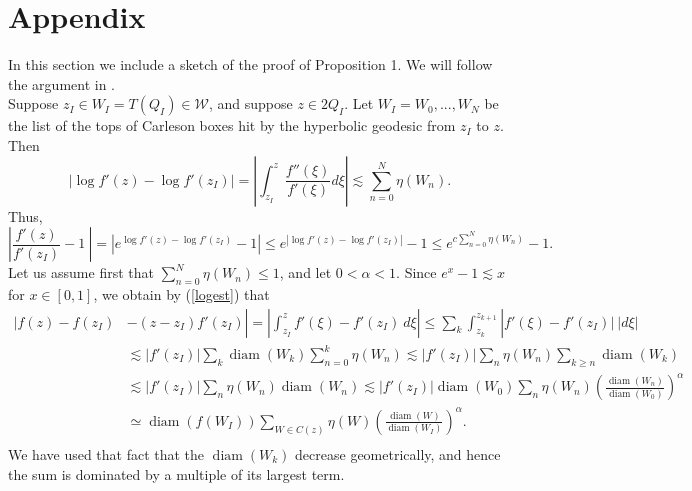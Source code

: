 \documentclass[12pt,a4paper]{article}
\theoremstyle{definition}
\theoremstyle{remark}
\newcommand{\diam}{\operatorname{diam}}
\numberwithin{komcounter}{section}
\begin{document}
\section{Appendix}

In this section we include a sketch of the proof of Proposition 1. We will follow the argument in \cite{b}.\\
Suppose $z_I \in W_I = T(Q_I) \in \mathcal{W}$, and suppose $ z \in 2Q_I$. Let $W_I = W_0, . . . ,W_N$
be the list of the tops of Carleson boxes hit by the hyperbolic geodesic from $z_I$ to $ z$. Then
$$
|\log f'(z)- \log f'(z_I)|=\left|\int_{z_I}^z \frac{f''(\xi)}{f'(\xi)}d\xi\right|\lesssim \sum_{n=0}^{N}
\eta(W_n).
$$
Thus,
\begin{equation}\label{logest}
\left|\frac{f'(z)}{f'(z_I)}-1~\right|=\left|e^{\log f'(z)- \log f'(z_I)}-1\right|\leq e^{|\log f'(z)- \log f'(z_I)|}-1\leq e^{c \sum_{n=0}^{N}
	\eta(W_n)}-1.
\end{equation}
Let us assume first that $\sum_{n=0}^{N}
\eta(W_n)\leq 1$, and let $0<\alpha<1$. Since $e^x-1\lesssim x$ for $x\in[0,1]$, we obtain by (\ref{logest}) that
\begin{align}\nonumber
|f(z)-f(z_I)&-(z-z_I) f'(z_I)|=\left|\int_{z_I}^z f'(\xi)-f'(z_I)~ d\xi\right|\leq  \sum_k\int_{z_k}^{z_{k+1}} |f'(\xi)-f'(z_I)|~ |d\xi|\\\nonumber
&\lesssim |f'(z_I)| \sum_k\diam(W_k) \sum_{n=0}^{k}\eta(W_n)
\lesssim |f'(z_I)| \sum_n \eta(W_n) \sum_{k\geq n} \diam(W_k)\\\nonumber
&\lesssim |f'(z_I)|\sum_n \eta(W_n) \diam(W_n) \lesssim |f'(z_I)|\diam(W_0) \sum_n \eta (W_n) \left(\frac {\diam (W_n)}{\diam (W_0)}\right)^\alpha \\\nonumber
&\simeq  \diam (f(W_I )) \sum_{W\in C(z)}
\eta(W) \left(\frac{\diam (W)} {\diam (W_I)}\right)^\alpha.\label{es}\\
\end{align}
 We have used that fact that the $\diam(W_k)$ decrease geometrically, and
hence the sum is dominated by a multiple of its largest term.
\end{document}
